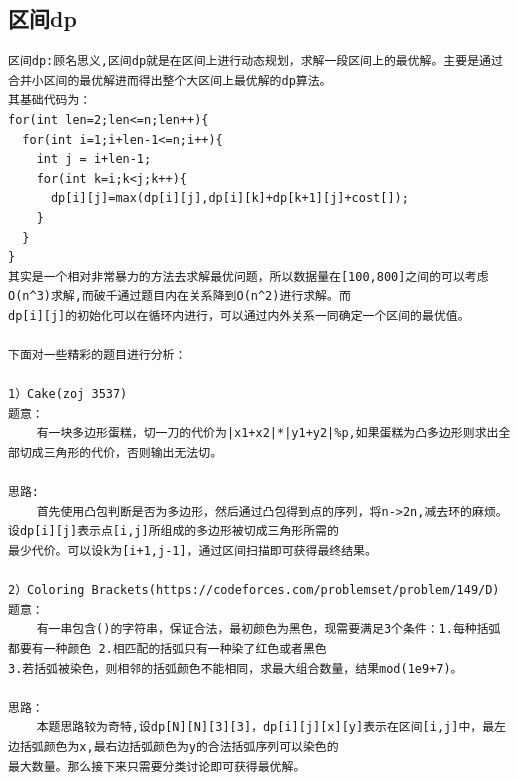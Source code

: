 \documentclass[twoside]{article}
\begin{document}
\subsection{区间dp}
\begin{lstlisting}
区间dp:顾名思义,区间dp就是在区间上进行动态规划，求解一段区间上的最优解。主要是通过合并小区间的最优解进而得出整个大区间上最优解的dp算法。
其基础代码为：
for(int len=2;len<=n;len++){
  for(int i=1;i+len-1<=n;i++){
    int j = i+len-1;
    for(int k=i;k<j;k++){
      dp[i][j]=max(dp[i][j],dp[i][k]+dp[k+1][j]+cost[]);
    }
  }
}
其实是一个相对非常暴力的方法去求解最优问题，所以数据量在[100,800]之间的可以考虑O(n^3)求解,而破千通过题目内在关系降到O(n^2)进行求解。而
dp[i][j]的初始化可以在循环内进行，可以通过内外关系一同确定一个区间的最优值。

下面对一些精彩的题目进行分析：

1）Cake(zoj 3537)
题意：
    有一块多边形蛋糕，切一刀的代价为|x1+x2|*|y1+y2|%p,如果蛋糕为凸多边形则求出全部切成三角形的代价，否则输出无法切。

思路:
    首先使用凸包判断是否为多边形，然后通过凸包得到点的序列，将n->2n,减去环的麻烦。设dp[i][j]表示点[i,j]所组成的多边形被切成三角形所需的
最少代价。可以设k为[i+1,j-1]，通过区间扫描即可获得最终结果。

2）Coloring Brackets(https://codeforces.com/problemset/problem/149/D)
题意：
    有一串包含()的字符串，保证合法，最初颜色为黑色，现需要满足3个条件：1.每种括弧都要有一种颜色 2.相匹配的括弧只有一种染了红色或者黑色
3.若括弧被染色，则相邻的括弧颜色不能相同，求最大组合数量，结果mod(1e9+7)。

思路：
    本题思路较为奇特,设dp[N][N][3][3]，dp[i][j][x][y]表示在区间[i,j]中，最左边括弧颜色为x,最右边括弧颜色为y的合法括弧序列可以染色的
最大数量。那么接下来只需要分类讨论即可获得最优解。


\end{lstlisting}
\end{document}
